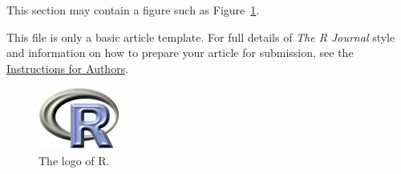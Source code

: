 This section may contain a figure such as Figure~\ref{figure:rlogo}.


This file is only a basic article template. For full details of \emph{The R Journal} style and information on how to prepare your article for submission, see the \href{http://journal.r-project.org/share/author-guide.pdf}{Instructions for Authors}.

\begin{figure}[htbp]
	\centering
	\includegraphics{Fig/Rlogo}
	\caption{The logo of R.}
	\label{figure:rlogo}
\end{figure}



\address{Author One\\
  Affiliation\\
  Address\\
  Country\\}

\address{Author Two\\
  Affiliation\\
  Address\\
  Country\\}

\address{Author Three\\
  Affiliation\\
  Address\\
  Country\\}
